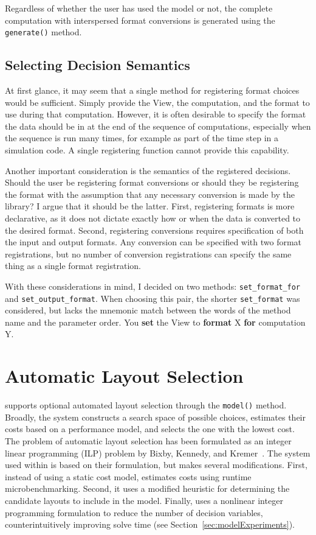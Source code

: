 Regardless of whether the user has used the model or not, 
the complete computation with interspersed format conversions is generated using the \verb.generate(). method.

\subsection{Selecting Decision Semantics}

At first glance, it may seem that a single method for registering format choices would be sufficient. 
Simply provide the View, the computation, and the format to use during that computation.
However, it is often desirable to specify the format the data should be in at the end of the sequence of computations, especially when the sequence is run many times, for example as part of the time step in a simulation code.
A single registering function cannot provide this capability. 

Another important consideration is the semantics of the registered decisions. 
Should the user be registering format conversions or should they be registering the format with the assumption that any necessary conversion is made by the library?
I argue that it should be the latter.
First, registering formats is more declarative, as it does not dictate exactly how or when the data is converted to the desired format.
Second, registering conversions requires specification of both the input and output formats. 
Any conversion can be specified with two format registrations, but no number of conversion registrations can specify the same thing as a single format registration.

With these considerations in mind, I decided on two methods: \verb.set_format_for. and \verb.set_output_format..
When choosing this pair, the shorter \verb.set_format. was considered, but lacks the mnemonic match between the words of the method name and the parameter order. You \textbf{set} the View to \textbf{format} X \textbf{for} computation Y. 


\section{Automatic Layout Selection}

\FormatDecisions{} supports optional automated layout selection through the \verb.model(). method.
Broadly, the system constructs a search space of possible choices, estimates their costs based on a performance model, and selects the one with the lowest cost.
The problem of automatic layout selection has been formulated as an integer linear programming (ILP) problem by Bixby, Kennedy, and Kremer~\cite{bixby1994automatic}.
The system used within \FormatDecisions{} is based on their formulation, but makes several modifications.
First, instead of using a static cost model, \FormatDecisions{} estimates costs using runtime microbenchmarking.
Second, it uses a modified heuristic for determining the candidate layouts to include in the model.
Finally, \FormatDecisions{} uses a nonlinear integer programming formulation to reduce the number of decision variables, counterintuitively improving solve time (see Section~\ref{sec:modelExperiments}).

